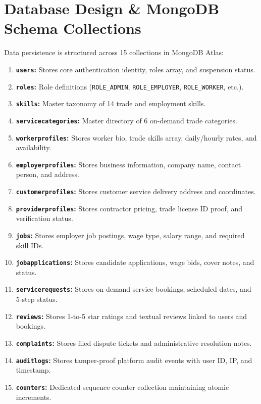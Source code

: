 \section{Database Design \& MongoDB Schema Collections}
Data persistence is structured across 15 collections in MongoDB Atlas:
\begin{enumerate}
    \item \textbf{\texttt{users}:} Stores core authentication identity, roles array, and suspension status.
    \item \textbf{\texttt{roles}:} Role definitions (\texttt{ROLE\_ADMIN}, \texttt{ROLE\_EMPLOYER}, \texttt{ROLE\_WORKER}, etc.).
    \item \textbf{\texttt{skills}:} Master taxonomy of 14 trade and employment skills.
    \item \textbf{\texttt{servicecategories}:} Master directory of 6 on-demand trade categories.
    \item \textbf{\texttt{workerprofiles}:} Stores worker bio, trade skills array, daily/hourly rates, and availability.
    \item \textbf{\texttt{employerprofiles}:} Stores business information, company name, contact person, and address.
    \item \textbf{\texttt{customerprofiles}:} Stores customer service delivery address and coordinates.
    \item \textbf{\texttt{providerprofiles}:} Stores contractor pricing, trade license ID proof, and verification status.
    \item \textbf{\texttt{jobs}:} Stores employer job postings, wage type, salary range, and required skill IDs.
    \item \textbf{\texttt{jobapplications}:} Stores candidate applications, wage bids, cover notes, and status.
    \item \textbf{\texttt{servicerequests}:} Stores on-demand service bookings, scheduled dates, and 5-step status.
    \item \textbf{\texttt{reviews}:} Stores 1-to-5 star ratings and textual reviews linked to users and bookings.
    \item \textbf{\texttt{complaints}:} Stores filed dispute tickets and administrative resolution notes.
    \item \textbf{\texttt{auditlogs}:} Stores tamper-proof platform audit events with user ID, IP, and timestamp.
    \item \textbf{\texttt{counters}:} Dedicated sequence counter collection maintaining atomic increments.
\end{enumerate}


